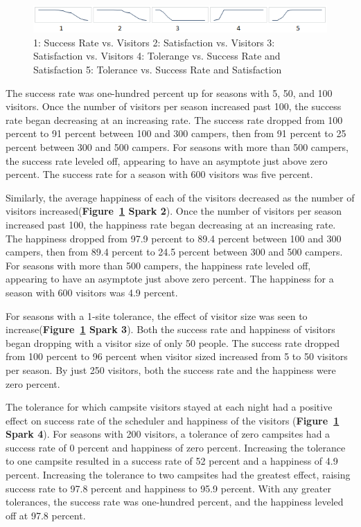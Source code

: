\documentclass[11pt]{article} %
\begin{document}
\begin{figure}[b]
  \centering
  \includegraphics[scale=.9]{imgs/sparklines.png}
  \caption{1: Success Rate vs. Visitors 2: Satisfaction
    vs. Visitors 3: Satisfaction vs. Visitors
    4: Tolerange vs. Success Rate and Satisfaction 5: Tolerance vs. Success Rate and Satisfaction}
  \label{fig:sparklines}
\end{figure}

The success rate was one-hundred percent up for seasons with 5, 50, and 100
visitors. Once the number of visitors per season increased past 100, the
success rate began decreasing at an increasing rate. The success rate
dropped from 100 percent to 91 percent between 100 and 300 campers, then
from 91 percent to 25 percent between 300 and 500 campers. For seasons with
more than 500 campers, the success rate leveled off, appearing to have an
asymptote just above zero percent. The success rate for a season with 600
visitors was five percent.

Similarly, the average happiness of each of the visitors decreased as the
number of visitors increased(\textbf{Figure~\ref{fig:sparklines} Spark 2}).
Once the number of visitors per season increased past 100, the
happiness rate began decreasing at an increasing rate. The happiness dropped
from 97.9 percent to 89.4 percent between 100 and 300 campers, then from 89.4
percent to 24.5 percent between 300 and 500 campers. For seasons with more
than 500 campers, the happiness rate leveled off, appearing to have an
asymptote just above zero percent. The happiness for a season with 600 visitors
was 4.9 percent.

For seasons with a  1-site tolerance, the effect of visitor size was seen to
increase(\textbf{Figure~\ref{fig:sparklines} Spark 3}). Both the
success rate and happiness of visitors began dropping with a visitor size of
only 50 people. The success rate dropped from 100 percent to 96 percent
when visitor sized increased from 5 to 50 visitors per season. By just 250
visitors, both the success rate and the happiness were zero percent.

The tolerance for which campsite visitors stayed at each night had a positive
effect on success rate of the scheduler and happiness of the visitors
(\textbf{Figure~\ref{fig:sparklines} Spark 4}).  For seasons with
200 visitors, a tolerance of zero campsites had a success rate of 0 percent
and happiness of zero percent. Increasing the tolerance to one campsite
resulted in a success rate of 52 percent and a happiness of 4.9 percent.
Increasing the tolerance to two campsites had the greatest effect, raising
success rate to 97.8 percent and happiness to 95.9 percent. With any greater
tolerances, the success rate was one-hundred percent, and the happiness
leveled off at 97.8 percent.
\end{document}
